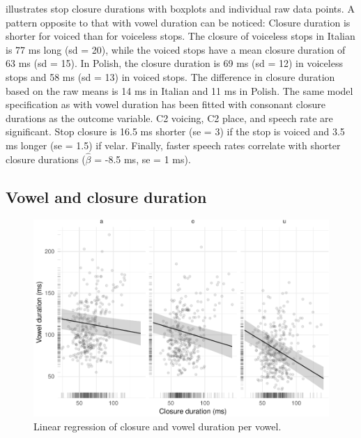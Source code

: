 \documentclass[preprint]{JASAnew}
\begin{document}
 illustrates stop closure durations with boxplots
and individual raw data points. A pattern opposite to that with vowel
duration can be noticed: Closure duration is shorter for voiced than for
voiceless stops. The closure of voiceless stops in Italian is 77 ms long
(sd = 20), while the voiced stops have a mean closure duration of 63 ms
(sd = 15). In Polish, the closure duration is 69 ms (sd = 12) in
voiceless stops and 58 ms (sd = 13) in voiced stops. The difference in
closure duration based on the raw means is 14 ms in Italian and 11 ms in
Polish. The same model specification as with vowel duration has been
fitted with consonant closure durations as the outcome variable. C2
voicing, C2 place, and speech rate are significant. Stop closure is 16.5
ms shorter (se = 3) if the stop is voiced and 3.5 ms longer (se = 1.5)
if velar. Finally, faster speech rates correlate with shorter closure
durations (\(\hat{\beta}\) = -8.5 ms, se = 1 ms).

\hypertarget{vowel-and-closure-duration}{%
\subsection{Vowel and closure
duration}\label{vowel-and-closure-duration}}

\begin{figure}
\includegraphics{2018-jasa_files/figure-latex/vow-clo-plot-1} \caption{Linear regression of closure and vowel duration per vowel.}\label{f:vow-clo-plot}
\end{figure}
\end{document}

